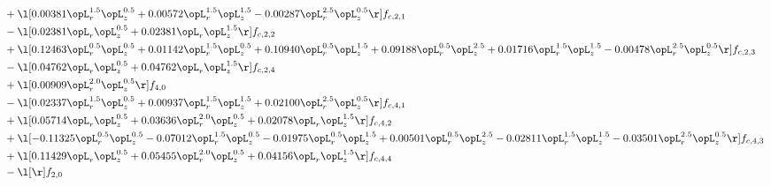 \begin{alignat}{2}
& + \l[  0.00381 \opL_r^{1.5} \opL_z^{0.5} +  0.00572 \opL_r^{1.5} \opL_z^{1.5}   -0.00287 \opL_r^{2.5} \opL_z^{0.5}  \r] f_{c,2,1} \nonumber \\ 
& - \l[  0.02381 \opL_r \opL_z^{0.5} +  0.02381 \opL_r \opL_z^{1.5}  \r] f_{c,2,2} \nonumber \\ 
& + \l[  0.12463 \opL_r^{0.5} \opL_z^{0.5} +  0.01142 \opL_r^{1.5} \opL_z^{0.5} +  0.10940 \opL_r^{0.5} \opL_z^{1.5} +  0.09188 \opL_r^{0.5} \opL_z^{2.5} +  0.01716 \opL_r^{1.5} \opL_z^{1.5}   -0.00478 \opL_r^{2.5} \opL_z^{0.5}  \r] f_{c,2,3} \nonumber \\ 
& - \l[  0.04762 \opL_r \opL_z^{0.5} +  0.04762 \opL_r \opL_z^{1.5}  \r] f_{c,2,4} \nonumber \\ 
& + \l[  0.00909 \opL_r^{2.0} \opL_z^{0.5}  \r] f_{4,0} \nonumber \\ 
& - \l[  0.02337 \opL_r^{1.5} \opL_z^{0.5} +  0.00937 \opL_r^{1.5} \opL_z^{1.5} +  0.02100 \opL_r^{2.5} \opL_z^{0.5}  \r] f_{c,4,1} \nonumber \\ 
& + \l[  0.05714 \opL_r \opL_z^{0.5} +  0.03636 \opL_r^{2.0} \opL_z^{0.5} +  0.02078 \opL_r \opL_z^{1.5}  \r] f_{c,4,2} \nonumber \\ 
& + \l[  -0.11325 \opL_r^{0.5} \opL_z^{0.5}   -0.07012 \opL_r^{1.5} \opL_z^{0.5}   -0.01975 \opL_r^{0.5} \opL_z^{1.5} +  0.00501 \opL_r^{0.5} \opL_z^{2.5}   -0.02811 \opL_r^{1.5} \opL_z^{1.5}   -0.03501 \opL_r^{2.5} \opL_z^{0.5}  \r] f_{c,4,3} \nonumber \\ 
& + \l[  0.11429 \opL_r \opL_z^{0.5} +  0.05455 \opL_r^{2.0} \opL_z^{0.5} +  0.04156 \opL_r \opL_z^{1.5}  \r] f_{c,4,4} \nonumber \\ 
& - \l[  \r] f_{2,0} \nonumber \\ 
\end{alignat} 


